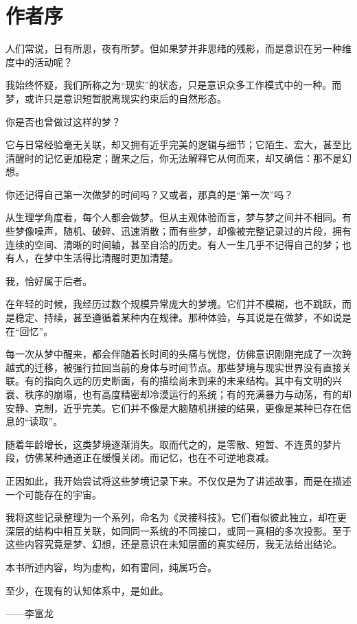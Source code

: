 \chapter*{作者序}

人们常说，日有所思，夜有所梦。但如果梦并非思绪的残影，而是意识在另一种维度中的活动呢？

我始终怀疑，我们所称之为“现实”的状态，只是意识众多工作模式中的一种。而梦，或许只是意识短暂脱离现实约束后的自然形态。

你是否也曾做过这样的梦？

它与日常经验毫无关联，却又拥有近乎完美的逻辑与细节；它陌生、宏大，甚至比清醒时的记忆更加稳定；醒来之后，你无法解释它从何而来，却又确信：那不是幻想。

你还记得自己第一次做梦的时间吗？又或者，那真的是“第一次”吗？

从生理学角度看，每个人都会做梦。但从主观体验而言，梦与梦之间并不相同。有些梦像噪声，随机、破碎、迅速消散；而有些梦，却像被完整记录过的片段，拥有连续的空间、清晰的时间轴，甚至自洽的历史。有人一生几乎不记得自己的梦；也有人，在梦中生活得比清醒时更加清楚。

我，恰好属于后者。

在年轻的时候，我经历过数个规模异常庞大的梦境。它们并不模糊，也不跳跃，而是稳定、持续，甚至遵循着某种内在规律。那种体验，与其说是在做梦，不如说是在“回忆”。

每一次从梦中醒来，都会伴随着长时间的头痛与恍惚，仿佛意识刚刚完成了一次跨越式的迁移，被强行拉回当前的身体与时间节点。那些梦境与现实世界没有直接关联。有的指向久远的历史断面，有的描绘尚未到来的未来结构。其中有文明的兴衰、秩序的崩塌，也有高度精密却冷漠运行的系统；有的充满暴力与动荡，有的却安静、克制，近乎完美。它们并不像是大脑随机拼接的结果，更像是某种已存在信息的“读取”。

随着年龄增长，这类梦境逐渐消失。取而代之的，是零散、短暂、不连贯的梦片段，仿佛某种通道正在缓慢关闭。而记忆，也在不可逆地衰减。

正因如此，我开始尝试将这些梦境记录下来。不仅仅是为了讲述故事，而是在描述一个可能存在的宇宙。

我将这些记录整理为一个系列，命名为《灵接科技》。它们看似彼此独立，却在更深层的结构中相互关联，如同同一系统的不同接口，或同一真相的多次投影。至于这些内容究竟是梦、幻想，还是意识在未知层面的真实经历，我无法给出结论。

本书所述内容，均为虚构，如有雷同，纯属巧合。

至少，在现有的认知体系中，是如此。

——李富龙

